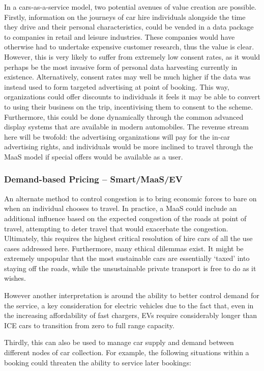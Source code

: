 \documentclass[journal]{IEEEtran}
\begin{document}
In a cars-as-a-service model, two potential avenues of value creation
are possible. Firstly, information on the journeys of car hire
individuals alongside the time they drive and their personal
characteristics, could be vended in a data package to companies in
retail and leisure industries. These companies would have otherwise
had to undertake expensive customer research, thus the value is
clear. However, this is very likely to suffer from extremely low
consent rates, as it would perhaps be the most invasive form of
personal data harvesting currently in existence. Alternatively,
consent rates may well be much higher if the data was instead used to
form targeted advertising at point of booking. This way, organizations
could offer discounts to individuals it feels it may be able to
convert to using their business on the trip, incentivising them to
consent to the scheme. Furthermore, this could be done dynamically
through the common advanced display systems that are available in
modern automobiles. The revenue stream here will be twofold: the
advertising organizations will pay for the in-car advertising rights,
and individuals would be more inclined to travel through the MaaS
model if special offers would be available as a user.


\subsubsection{Demand-based Pricing -- Smart/MaaS/EV}

An alternate method to control congestion is to bring economic forces
to bare on when an individual chooses to travel. In practice, a MaaS
could include an additional influence based on the expected congestion
of the roads at point of travel, attempting to deter travel that would
exacerbate the congestion. Ultimately, this requires the highest
critical resolution of hire cars of all the use cases addressed
here. Furthermore, many ethical dilemmas exist. It might be extremely
unpopular that the most sustainable cars are essentially `taxed' into
staying off the roads, while the unsustainable private transport is
free to do as it wishes.

However another interpretation is around the ability to better control
demand for the service, a key consideration for electric vehicles due
to the fact that, even in the increasing affordability of fast
chargers, EVs require considerably longer than ICE cars to transition
from zero to full range capacity.
 
Thirdly, this can also be used to manage car supply and demand between
different nodes of car collection. For example, the following
situations within a booking could threaten the ability to service
later bookings:
\end{document}
